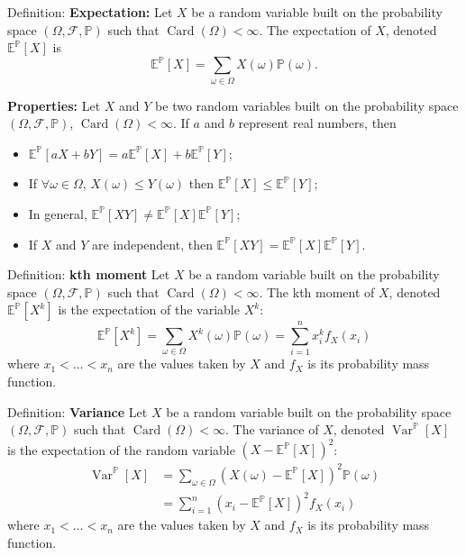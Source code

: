 \documentclass[12pt,a4paper]{article}
\begin{document}
Definition: \textbf{Expectation:}
Let $X$ be a random variable built on the probability space $(\Omega, \mathcal{F}, \mathbb{P})$ such that $\operatorname{Card}(\Omega) < \infty$. The expectation of $X$, denoted $\mathbb{E}^{\mathbb{P}}[X]$ is
\[
\mathbb{E}^{\mathbb{P}}[X] = \sum_{\omega \in \Omega} X(\omega) \mathbb{P}(\omega).
\]
\vspace{1em}

\textbf{Properties:}
\vspace{0.5em}
Let $X$ and $Y$ be two random variables built on the probability space $(\Omega, \mathcal{F}, \mathbb{P})$, $\operatorname{Card}(\Omega) < \infty$. If $a$ and $b$ represent real numbers, then
\begin{itemize}
	\item[E1] $\mathbb{E}^{\mathbb{P}}[aX + bY] = a\mathbb{E}^{\mathbb{P}}[X] + b\mathbb{E}^{\mathbb{P}}[Y]$;
	\item[E2] If $\forall \omega \in \Omega$, $X(\omega) \leq Y(\omega)$ then $\mathbb{E}^{\mathbb{P}}[X] \leq \mathbb{E}^{\mathbb{P}}[Y]$;
	\item[E3] In general, $\mathbb{E}^{\mathbb{P}}[XY] \neq \mathbb{E}^{\mathbb{P}}[X]\mathbb{E}^{\mathbb{P}}[Y]$;
	\item[E4] If $X$ and $Y$ are independent, then $\mathbb{E}^{\mathbb{P}}[XY] = \mathbb{E}^{\mathbb{P}}[X]\mathbb{E}^{\mathbb{P}}[Y]$.
\end{itemize}
\vspace{1em}

Definition: \textbf{kth moment}
\vspace{0.5em}
Let $X$ be a random variable built on the probability space $(\Omega, \mathcal{F}, \mathbb{P})$ such that $\operatorname{Card}(\Omega) < \infty$. The kth moment of $X$, denoted $\mathbb{E}^{\mathbb{P}}\left[X^k\right]$ is the expectation of the variable $X^k$:
\[
\mathbb{E}^{\mathbb{P}}\left[X^k\right] = \sum_{\omega \in \Omega} X^k(\omega) \mathbb{P}(\omega) = \sum_{i=1}^{n} x_i^k f_X(x_i)
\]
where $x_1 < \ldots < x_n$ are the values taken by $X$ and $f_X$ is its probability mass function.
\vspace{1em}

Definition: \textbf{Variance}
\vspace{0.5em}
Let $X$ be a random variable built on the probability space $(\Omega, \mathcal{F}, \mathbb{P})$ such that $\operatorname{Card}(\Omega) < \infty$. The variance of $X$, denoted $\operatorname{Var}^{\mathbb{P}}[X]$ is the expectation of the random variable $\left(X - \mathbb{E}^{\mathbb{P}}[X]\right)^2$:
\begin{align}
\operatorname{Var}^{\mathbb{P}}[X] &= \sum_{\omega \in \Omega} \left(X(\omega) - \mathbb{E}^{\mathbb{P}}[X]\right)^2 \mathbb{P}(\omega) \\
&= \sum_{i=1}^{n} \left(x_i - \mathbb{E}^{\mathbb{P}}[X]\right)^2 f_X(x_i)
\end{align}
where $x_1 < \ldots < x_n$ are the values taken by $X$ and $f_X$ is its probability mass function.
\vspace{1em}
\end{document}
